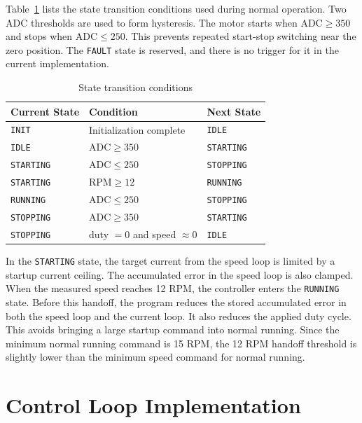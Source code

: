 \documentclass[12pt, a4paper]{report}
\begin{document}
Table~\ref{tab:motor_transitions} lists the state transition conditions used during normal operation. Two ADC thresholds are used to form hysteresis. The motor starts when $\text{ADC} \geq 350$ and stops when $\text{ADC} \leq 250$. This prevents repeated start-stop switching near the zero position. The \texttt{FAULT} state is reserved, and there is no trigger for it in the current implementation.

\begin{table}[H]
\centering
\caption{State transition conditions}
\label{tab:motor_transitions}
\begin{tabular}{@{}lll@{}}
\toprule
Current State & Condition & Next State \\
\midrule
\texttt{INIT}     & Initialization complete              & \texttt{IDLE}     \\
\texttt{IDLE}     & $\text{ADC} \geq 350$                & \texttt{STARTING} \\
\texttt{STARTING} & $\text{ADC} \leq 250$                & \texttt{STOPPING} \\
\texttt{STARTING} & $\text{RPM} \geq 12$                 & \texttt{RUNNING}  \\
\texttt{RUNNING}  & $\text{ADC} \leq 250$                & \texttt{STOPPING} \\
\texttt{STOPPING} & $\text{ADC} \geq 350$                & \texttt{STARTING} \\
\texttt{STOPPING} & duty $= 0$ and speed $\approx 0$     & \texttt{IDLE}     \\
\bottomrule
\end{tabular}
\end{table}

In the \texttt{STARTING} state, the target current from the speed loop is limited by a startup current ceiling. The accumulated error in the speed loop is also clamped. When the measured speed reaches 12 RPM, the controller enters the \texttt{RUNNING} state. Before this handoff, the program reduces the stored accumulated error in both the speed loop and the current loop. It also reduces the applied duty cycle. This avoids bringing a large startup command into normal running. Since the minimum normal running command is 15 RPM, the 12 RPM handoff threshold is slightly lower than the minimum speed command for normal running.


\section{Control Loop Implementation}
\end{document}
